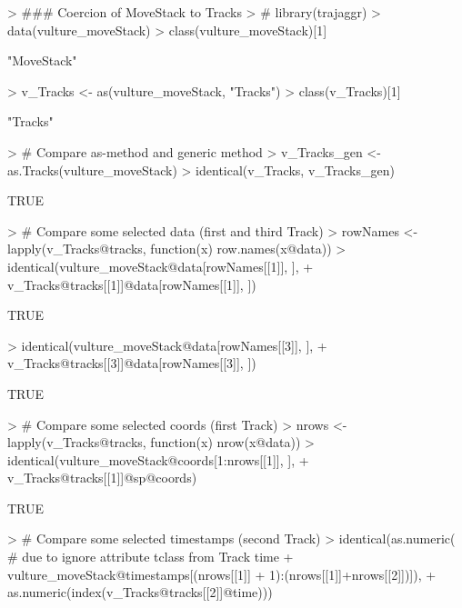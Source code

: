 \documentclass[12pt, oneside, a4paper]{scrbook}
\begin{document}
\begin{small}
\begin{Schunk}
\begin{Sinput}
> ### Coercion of MoveStack to Tracks
> # library(trajaggr)
> data(vulture_moveStack)
> class(vulture_moveStack)[1]
\end{Sinput}
\begin{Soutput}
[1] "MoveStack"
\end{Soutput}
\begin{Sinput}
> v_Tracks <- as(vulture_moveStack, "Tracks")
> class(v_Tracks)[1]
\end{Sinput}
\begin{Soutput}
[1] "Tracks"
\end{Soutput}
\begin{Sinput}
> # Compare as-method and generic method
> v_Tracks_gen <- as.Tracks(vulture_moveStack)
> identical(v_Tracks, v_Tracks_gen)
\end{Sinput}
\begin{Soutput}
[1] TRUE
\end{Soutput}
\begin{Sinput}
> # Compare some selected data (first and third Track)
> rowNames <- lapply(v_Tracks@tracks, function(x) row.names(x@data))
> identical(vulture_moveStack@data[rowNames[[1]], ],
+           v_Tracks@tracks[[1]]@data[rowNames[[1]], ])
\end{Sinput}
\begin{Soutput}
[1] TRUE
\end{Soutput}
\begin{Sinput}
> identical(vulture_moveStack@data[rowNames[[3]], ],
+           v_Tracks@tracks[[3]]@data[rowNames[[3]], ])
\end{Sinput}
\begin{Soutput}
[1] TRUE
\end{Soutput}
\begin{Sinput}
> # Compare some selected coords (first Track)
> nrows <- lapply(v_Tracks@tracks, function(x) nrow(x@data))
> identical(vulture_moveStack@coords[1:nrows[[1]], ],
+           v_Tracks@tracks[[1]]@sp@coords)
\end{Sinput}
\begin{Soutput}
[1] TRUE
\end{Soutput}
\begin{Sinput}
> # Compare some selected timestamps (second Track)
> identical(as.numeric( # due to ignore attribute tclass from Track time
+   vulture_moveStack@timestamps[(nrows[[1]] + 1):(nrows[[1]]+nrows[[2]])]),
+           as.numeric(index(v_Tracks@tracks[[2]]@time)))

\end{Sinput}
\end{Schunk}
\end{small}
\end{document}
